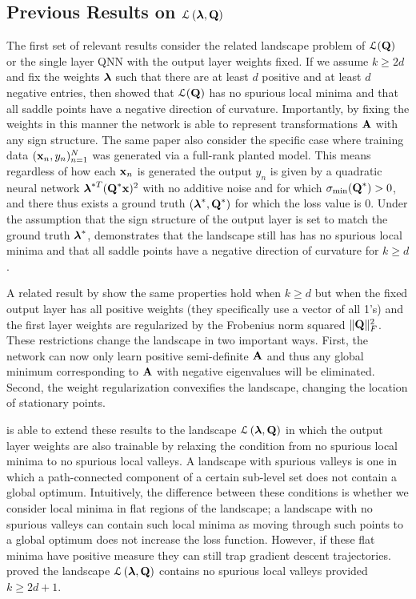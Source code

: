 \documentclass[11pt]{article}
\theoremstyle{plain}
\DeclareMathOperator*{\llq}{\ensuremath{\mathcal{L} \left(\V{\lambda},\Mx{Q}\right)} }
\theoremstyle{plain}
\numberwithin{equation}{section}
\numberwithin{lemma}{section}
\numberwithin{theorem}{section}
\numberwithin{corollary}{section}
\numberwithin{observation}{section}
\numberwithin{definition}{section}
\numberwithin{example}{section}
\begin{document}
\subsection{Previous Results on \texorpdfstring{$\llq$}{L(l,Q)}}
\label{sec:previousWork}

The first set of relevant results consider the related landscape problem of $\mathcal{L}(\Mx{Q})$ or the single layer QNN with the output layer weights fixed.  If we assume $k \geq 2d$ and fix the weights $\V{\lambda}$ such that there are at least $d$ positive and at least $d$ negative entries, then \cite{JS19} showed that $\mathcal{L}(\Mx{Q})$ has no spurious local minima and that all saddle points have a negative direction of curvature.  Importantly, by fixing the weights in this manner the network is able to represent transformations $\Mx{A}$ with any sign structure. The same paper also consider the specific case where training data $(\V{x}_n, y_n)_{n=1}^N$ was generated via a full-rank planted model.  This means regardless of how each $\V{x}_n$ is generated the output $y_n$ is given by a quadratic neural network $\V{\lambda}^{*T} (\Mx{Q}^* \V{x})^2$ with no additive noise and for which $\sigma_{\text{min}}(\Mx{Q}^*) > 0$, and there thus exists a ground truth $(\V{\lambda}^*, \Mx{Q}^*)$ for which the loss value is 0.  Under the assumption that the sign structure of the output layer is set to match the ground truth $\V{\lambda}^*$, \cite{JS19} demonstrates that the landscape still has has no spurious local minima and that all saddle points have a negative direction of curvature for $k \geq d$.


A related result by \cite{du2018power} show the same properties hold when $k \geq d$ but when the fixed output layer has all positive weights (they specifically use a vector of all 1's) and the first layer weights are regularized by the Frobenius norm squared $\|\Mx{Q}\|_F^2$.  These restrictions change the landscape in two important ways.  First, the network can now only learn positive semi-definite $\Mx{A}$ and thus any global minimum corresponding to $\Mx{A}$ with negative eigenvalues will be eliminated.  Second, the weight regularization convexifies the landscape, changing the location of stationary points.

\cite{venturi2019spurious} is able to extend these results to the landscape $\llq$ in which the output layer weights are also trainable by relaxing the condition from no spurious local minima to no spurious local valleys.  A landscape with spurious valleys is one in which a path-connected component of a certain sub-level set does not contain a global optimum. Intuitively, the difference between these conditions is whether we consider local minima in flat regions of the landscape; a landscape with no spurious valleys can contain such local minima as moving through such points to a global optimum does not increase the loss function.  However, if these flat minima have positive measure they can still trap gradient descent trajectories.  \cite{venturi2019spurious} proved the landscape $\llq$ contains no spurious local valleys provided $k \geq 2d + 1$.
\end{document}
